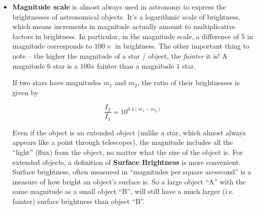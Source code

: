 \begin{itemize}
\item \textbf{Magnitude scale} is almost always used in astronomy to
  express the brightnesses of astronomical objects. It's a logarithmic
  scale of brightness, which means increments in magnitude actually
  amount to multiplicative factors in brightness. In particular, in
  the magnitude scale, a difference of 5 in magnitude corresponds to
  $100 \times$ in brightness. The other important thing to note -- the
  higher the magnitude of a star / object, the \emph{fainter} it is! A
  magnitude $6$ star is a $100 x$ fainter than a magnitude $1$ star.

  If two stars have magnitudes $m_1$ and $m_2$, the ratio of their
  brightnesses is given by

  \begin{equation}
    \frac{I_2}{I_1} = 10^{0.4(m_1 - m_2)}
  \end{equation}

  Even if the object is an extended object (unlike a star, which
  almost always appears like a point through telescopes), the
  magnitude includes all the ``light'' (flux) from the object, no
  matter what the size of the object is. For extended objects, a
  definition of \textbf{Surface Brightness} is more
  convenient. Surface brightness, often measured in ``magnitudes per
  square arcsecond'' is a measure of how bright an object's surface
  is. So a large object ``A'' with the same magnitude as a small
  object ``B'', will still have a much larger (i.e. fainter) surface
  brightness than object ``B''.

\end{itemize}
